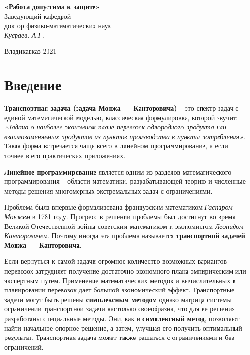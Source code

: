 \documentclass[a4paper,12pt]{article}
\begin{document}
\begin{flushright}
	\textbf{«Работа допустима к защите»}\\
	Заведующий кафедрой\\
	доктор физико-математических наук\\
	\textit{Кусраев. А.Г. \underline{\hspace{3cm}}}\\
\end{flushright}

\normalsize{ \hspace{28pt}} \hfill \break
\begin{center} Владикавказ 2021 \end{center}

\thispagestyle{empty}
\tableofcontents
\thispagestyle{empty}
\clearpage
\newtheorem{theorem}{Теорема}

\section {Введение}
	\textbf{Транспортная задача (задача Монжа — Канторовича)} – это спектр задач с единой математической моделью, классическая формулировка, которой звучит: \textit{«Задача о наиболее экономном плане перевозок однородного продукта или взаимозаменяемых продуктов из пунктов производства в пункты потребления»}. Такая форма встречается чаще всего в линейном программирование, а если точнее в его практических приложениях. 
	
	\textbf{Линейное программирование} является одним из разделов математического программирования – области математики, разрабатывающей теорию и численные методы решения многомерных экстремальных задач с ограничениями.
	
	Проблема была впервые формализована французским математиком \textit{Гаспаром Монжем} в 1781 году. Прогресс в решении проблемы был достигнут во время Великой Отечественной войны советским математиком и экономистом \textit{Леонидом Канторовичем}. Поэтому иногда эта проблема называется \textbf{транспортной задачей Монжа — Канторовича}.
	
	Если вернуться к самой задачи огромное количество возможных вариантов перевозок затрудняет получение достаточно экономного плана эмпирическим или экспертным путем. Применение математических методов и вычислительных в планировании перевозок дает большой экономический эффект. Транспортные задачи могут быть решены \textbf{симплексным методом} однако матрица системы ограничений транспортной задачи настолько своеобразна, что для ее решения разработаны специальные методы. Они, как и \textbf{симплексный метод}, позволяют найти начальное опорное решение, а затем, улучшая его получить оптимальный результат. Транспортная задача может
	также решаться с ограничениями и без ограничений.
	
\end{document}
